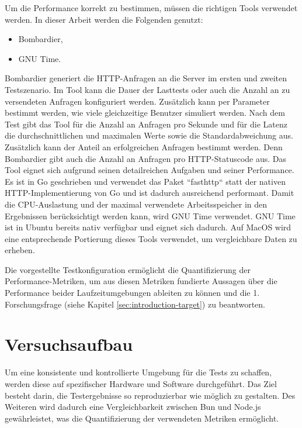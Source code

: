 \noindent
Um die Performance korrekt zu bestimmen, müssen die richtigen Tools verwendet werden. In dieser Arbeit werden die Folgenden genutzt:

\begin{itemize}
	\item Bombardier,
	\item GNU Time.
\end{itemize}

\noindent
Bombardier generiert die HTTP-Anfragen an die Server im ersten und zweiten Testszenario. Im Tool kann die Dauer der Lasttests oder auch die Anzahl an zu versendeten Anfragen konfiguriert werden. Zusätzlich kann per Parameter bestimmt werden, wie viele gleichzeitige Benutzer simuliert werden. Nach dem Test gibt das Tool für die Anzahl an Anfragen pro Sekunde und für die Latenz die durchschnittlichen und maximalen Werte sowie die Standardabweichung aus. Zusätzlich kann der Anteil an erfolgreichen Anfragen bestimmt werden. Denn Bombardier gibt auch die Anzahl an Anfragen pro HTTP-Statuscode aus. Das Tool eignet sich aufgrund seinen detailreichen Aufgaben und seiner Performance. Es ist in Go geschrieben und verwendet das Paket ``fasthttp`` statt der nativen HTTP-Implementierung von Go und ist dadurch ausreichend performant. Damit die CPU-Auslastung und der maximal verwendete Arbeitsspeicher in den Ergebnissen berücksichtigt werden kann, wird GNU Time verwendet. GNU Time ist in Ubuntu bereits nativ verfügbar und eignet sich dadurch. Auf MacOS wird eine entsprechende Portierung dieses Tools verwendet, um vergleichbare Daten zu erheben.

\noindent
Die vorgestellte Testkonfiguration ermöglicht die Quantifizierung der Performance-Metriken, um aus diesen Metriken fundierte Aussagen über die Performance beider Laufzeitumgebungen ableiten zu können und die 1. Forschungsfrage (siehe Kapitel \ref{sec:introduction-target}) zu beantworten.


\section{Versuchsaufbau} \label{sec:performance-testSetup}
Um eine konsistente und kontrollierte Umgebung für die Tests zu schaffen, werden diese auf spezifischer Hardware und Software durchgeführt. Das Ziel besteht darin, die Testergebnisse so reproduzierbar wie möglich zu gestalten. Des Weiteren wird dadurch eine Vergleichbarkeit zwischen Bun und Node.js gewährleistet, was die Quantifizierung der verwendeten Metriken ermöglicht.

